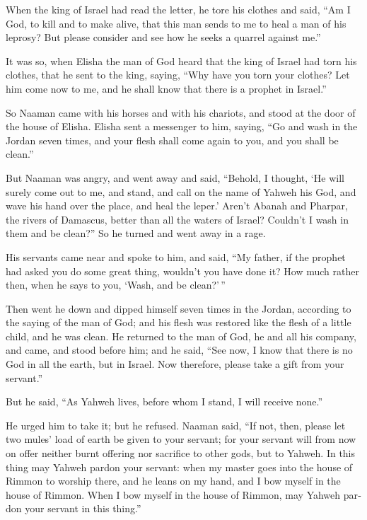 \begin{paracol}{2}
\begin{otherlanguage}{english}
 When the king of Israel had read the letter, he tore his
clothes and said, ``Am I God, to kill and to make alive, that this man
sends to me to heal a man of his leprosy? But please consider and see
how he seeks a quarrel against me.''

 It was so, when Elisha the man of God heard that the king
of Israel had torn his clothes, that he sent to the king, saying, ``Why
have you torn your clothes? Let him come now to me, and he shall know
that there is a prophet in Israel.''

 So Naaman came with his horses and with his chariots, and
stood at the door of the house of Elisha.  Elisha sent a
messenger to him, saying, ``Go and wash in the Jordan seven times, and
your flesh shall come again to you, and you shall be clean.''

 But Naaman was angry, and went away and said, ``Behold,
I thought, `He will surely come out to me, and stand, and call on the
name of Yahweh his God, and wave his hand over the place, and heal the
leper.'  Aren't Abanah and Pharpar, the rivers of
Damascus, better than all the waters of Israel? Couldn't I wash in them
and be clean?'' So he turned and went away in a rage.

 His servants came near and spoke to him, and said, ``My
father, if the prophet had asked you do some great thing, wouldn't you
have done it? How much rather then, when he says to you, `Wash, and be
clean?'\,''

 Then went he down and dipped himself seven times in the
Jordan, according to the saying of the man of God; and his flesh was
restored like the flesh of a little child, and he was clean.
 He returned to the man of God, he and all his company,
and came, and stood before him; and he said, ``See now, I know that
there is no God in all the earth, but in Israel. Now therefore, please
take a gift from your servant.''

 But he said, ``As Yahweh lives, before whom I stand, I
will receive none.''

He urged him to take it; but he refused.  Naaman said,
``If not, then, please let two mules' load of earth be given to your
servant; for your servant will from now on offer neither burnt offering
nor sacrifice to other gods, but to Yahweh.  In this
thing may Yahweh pardon your servant: when my master goes into the house
of Rimmon to worship there, and he leans on my hand, and I bow myself in
the house of Rimmon. When I bow myself in the house of Rimmon, may
Yahweh pardon your servant in this thing.''


\end{otherlanguage}
\end{paracol}
